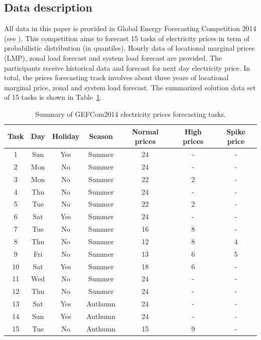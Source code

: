 \documentclass[review]{elsarticle}
\begin{document}
    \subsection{Data description}
      All data in this paper is provided in Global Energy Forecasting Competition 2014 (see \cite{Hong2016}).
      This competition aims to forecast 15 tasks of electricity prices in term of probabilistic distribution (in quantiles).
      Hourly data of locational marginal prices (LMP), zonal load forecast and system load forecast are provided.
      The participants receive historical data and forecast for next day electricity price.
      In total, the prices forecasting track involves about three years of locational marginal price, zonal and system load forecast.
      The summarized solution data set of 15 tasks is shown in Table~\ref{table:price_data_set}.
      \begin{table}[H]
        \begin{center}
        \caption{Summary of GEFCom2014 electricity prices forecasting tasks.}
        \begin{adjustbox}{width=\textwidth}
          \begin{tabular}{|c|c|c|c|c|c|c|}
            \hline
            Task & Day & Holiday & Season & Normal prices & High prices & Spike price\\
            \hline
            1 & Sun & Yes & Summer & 24 & - & -\\
            2 & Mon & No & Summer & 24 & - & -\\
            3 & Mon & No & Summer & 22 & 2 & -\\
            4 & Thu & No & Summer & 24 & - & -\\
            5 & Tue & No & Summer & 22 & 2 & -\\
            6 & Sat & Yes & Summer & 24 & - & -\\
            7 & Tue & No & Summer & 16 & 8 & -\\
            8 & Thu & No & Summer & 12 & 8 & 4\\
            9 & Fri & No & Summer & 13 & 6 & 5\\
            10 & Sat & Yes & Summer & 18 & 6 & -\\
            11 & Wed & No & Summer & 24 & - & -\\
            12 & Thu & No & Summer & 24 & - & -\\
            13 & Sat & Yes & Authumn & 24 & - & -\\
            14 & Sun & Yes & Authumn & 24 & - & -\\
            15 & Tue & No & Authumn & 15 & 9 & -\\
            \hline
          \end{tabular}
        \end{adjustbox}
        \label{table:price_data_set}
        \end{center}
      \end{table}
\end{document}

